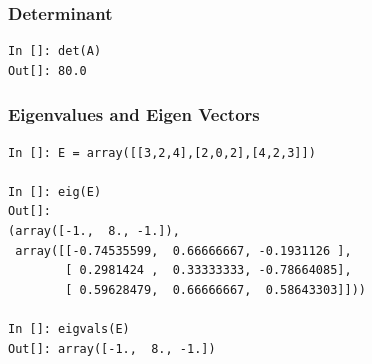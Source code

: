 \documentclass[14pt,compress]{beamer}
\newcounter{time}
\newcommand{\inctime}[1]{\addtocounter{time}{#1}{\tiny \thetime\ m}}
\begin{document}
\begin{frame}[fragile]
\frametitle{Determinant}
\begin{lstlisting}
In []: det(A)
Out[]: 80.0
\end{lstlisting}
\end{frame}

\begin{frame}[fragile]
\frametitle{Eigenvalues and Eigen Vectors}
\begin{small}
\begin{lstlisting}
In []: E = array([[3,2,4],[2,0,2],[4,2,3]])

In []: eig(E)
Out[]: 
(array([-1.,  8., -1.]),
 array([[-0.74535599,  0.66666667, -0.1931126 ],
        [ 0.2981424 ,  0.33333333, -0.78664085],
        [ 0.59628479,  0.66666667,  0.58643303]]))

In []: eigvals(E)
Out[]: array([-1.,  8., -1.])
\end{lstlisting}
\end{small}
\end{frame}


\end{document}
